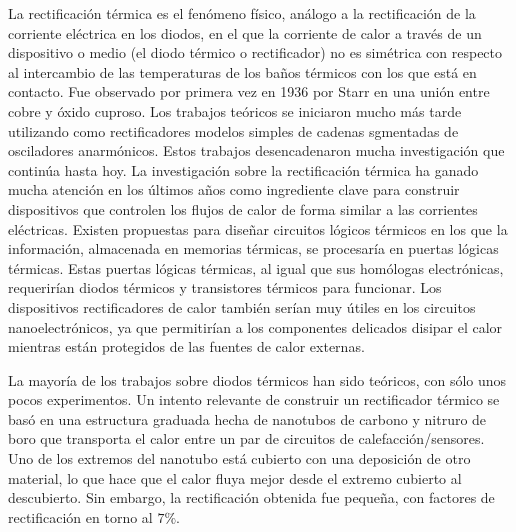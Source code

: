 La rectificación térmica es el fenómeno físico, análogo a la rectificación de la corriente eléctrica en los diodos, en el que la corriente de calor a través de un dispositivo o medio (el diodo térmico o rectificador) no es simétrica con respecto al intercambio de las temperaturas de los baños térmicos con los que está en contacto. Fue observado por primera vez en 1936 por Starr en una unión entre cobre y óxido cuproso. Los trabajos teóricos se iniciaron mucho más tarde utilizando como rectificadores modelos simples de cadenas sgmentadas de osciladores anarmónicos. Estos trabajos desencadenaron mucha investigación que continúa hasta hoy. La investigación sobre la rectificación térmica ha ganado mucha atención en los últimos años como ingrediente clave para construir dispositivos que controlen los flujos de calor de forma similar a las corrientes eléctricas. Existen propuestas para diseñar circuitos lógicos térmicos en los que la información, almacenada en memorias térmicas, se procesaría en puertas lógicas térmicas. Estas puertas lógicas térmicas, al igual que sus homólogas electrónicas, requerirían diodos térmicos y transistores térmicos para funcionar.
Los dispositivos rectificadores de calor también serían muy útiles en los circuitos nanoelectrónicos, ya que permitirían a los componentes delicados disipar el calor mientras están protegidos de las fuentes de calor externas.

La mayoría de los trabajos sobre diodos térmicos han sido teóricos, con sólo unos pocos experimentos. Un intento relevante de construir un rectificador térmico se basó en una estructura graduada hecha de nanotubos de carbono y nitruro de boro que transporta el calor entre un par de circuitos de calefacción/sensores. Uno de los extremos del nanotubo está cubierto con una deposición de otro material, lo que hace que el calor fluya mejor desde el extremo cubierto al descubierto. Sin embargo, la rectificación obtenida fue pequeña, con factores de rectificación en torno al $7\%$.

